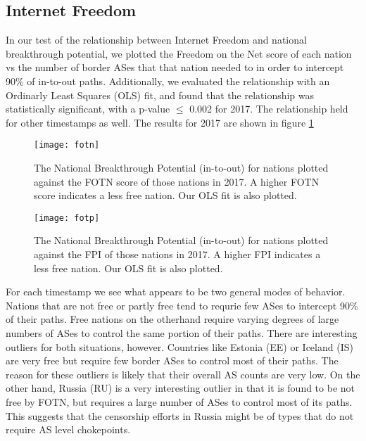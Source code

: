\subsection{Internet Freedom}

In our test of the relationship between Internet Freedom and national
breakthrough potential, we plotted the Freedom on the Net score of each nation
vs the number of border ASes that that nation needed to in order to intercept
90\% of in-to-out paths. Additionally, we evaluated the relationship with an
Ordinarly Least Squares (OLS) fit, and found that the relationship was
statistically significant, with a p-value $\leq$ 0.002 for 2017. The
relationship held for other timestamps as well. The results for 2017 are shown
in figure \ref{fig:fotn}

\begin{figure}
	\centering
	\texttt{[image: fotn]}
	\caption{The National Breakthrough Potential (in-to-out) for nations plotted against the FOTN score
	of those nations in 2017. A higher FOTN score indicates a less free nation. Our OLS fit is also plotted.}\label{fig:fotn}
\end{figure}

\begin{figure}
	\centering
	\texttt{[image: fotp]}
	\caption{The National Breakthrough Potential (in-to-out) for nations plotted against the FPI
	of those nations in 2017. A higher FPI indicates a less free nation. Our OLS fit is also plotted.}\label{fig:fotp}
\end{figure}

For each timestamp we see what appears to be two general modes of behavior.
Nations that are not free or partly free tend to requrie few ASes to intercept
90\% of their paths. Free nations on the otherhand require varying degrees of
large numbers of ASes to control the same portion of their paths. There are
interesting outliers for both situations, however. Countries like Estonia (EE)
or Iceland (IS) are very free but require few border ASes to control most of
their paths. The reason for these outliers is likely that their overall AS
counts are very low. On the other hand, Russia (RU) is a very interesting
outlier in that it is found to be not free by FOTN, but requires a large number
of ASes to control most of its paths. This suggests that the censorship efforts
in Russia might be of types that do not require AS level chokepoints.
